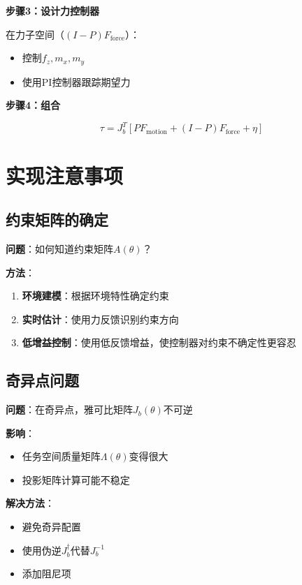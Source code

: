 \documentclass[12pt,a4paper]{article}
\begin{document}
\textbf{步骤3：设计力控制器}

在力子空间（$(I-P)F_{\text{force}}$）：
\begin{itemize}
\item 控制$f_z, m_x, m_y$
\item 使用PI控制器跟踪期望力
\end{itemize}

\textbf{步骤4：组合}

\begin{equation}
\tau = J_b^T[PF_{\text{motion}} + (I-P)F_{\text{force}} + \eta]
\end{equation}

\section{实现注意事项}

\subsection{约束矩阵的确定}

\textbf{问题}：如何知道约束矩阵$A(\theta)$？

\textbf{方法}：
\begin{enumerate}
\item \textbf{环境建模}：根据环境特性确定约束
\item \textbf{实时估计}：使用力反馈识别约束方向
\item \textbf{低增益控制}：使用低反馈增益，使控制器对约束不确定性更容忍
\end{enumerate}

\subsection{奇异点问题}

\textbf{问题}：在奇异点，雅可比矩阵$J_b(\theta)$不可逆

\textbf{影响}：
\begin{itemize}
\item 任务空间质量矩阵$\Lambda(\theta)$变得很大
\item 投影矩阵计算可能不稳定
\end{itemize}

\textbf{解决方法}：
\begin{itemize}
\item 避免奇异配置
\item 使用伪逆$J_b^{\dagger}$代替$J_b^{-1}$
\item 添加阻尼项
\end{itemize}
\end{document}
